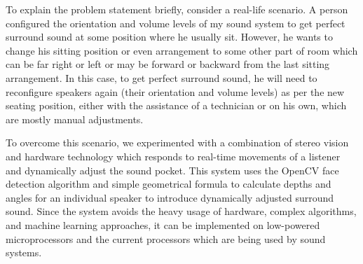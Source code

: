 \documentclass[../../../patent_v1.tex]{subfiles}
\begin{document}
To explain the problem statement briefly, consider a real-life scenario. A person 
configured the orientation and volume levels of my sound system to get perfect 
surround sound at some position where he usually sit. However, he wants to 
change his sitting position or even arrangement to some other part of room 
which can be far right or left or may be forward or backward from the last sitting 
arrangement. In this case, to get perfect surround sound, he will need to reconfigure  
speakers again (their orientation and volume levels) as per the new seating 
position, either with the assistance of a technician or on his own, which are mostly 
manual adjustments.

To overcome this scenario, we experimented with a combination of stereo vision and 
hardware technology which responds to real-time movements of a listener and dynamically 
adjust the sound pocket. This system uses the OpenCV face detection algorithm and 
simple geometrical formula to calculate depths and angles for an individual speaker 
to introduce dynamically adjusted surround sound. Since the system avoids the heavy 
usage of hardware, complex algorithms, and machine learning approaches, it can be 
implemented on low-powered microprocessors and the current processors which are being used by 
sound systems.
\end{document}

